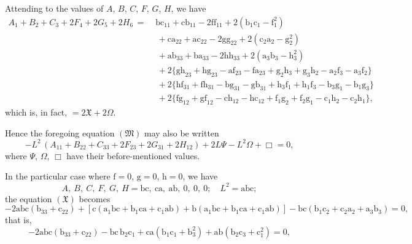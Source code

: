 \documentclass[11pt,a4paper]{article}
\begin{document}
Attending to the values of $A$, $B$, $C$, $F$, $G$, $H$, we have
\begin{align*}
A_{1} + B_{2} + C_{3} + 2F_{4} + 2G_{5} + 2H_{6}\,= \;& \text{bc}_{11} + \text{cb}_{11} - 2\text{ff}_{11} + 2(\text{b}_{1}\text{c}_{1} - \text{f}_{1}^{2})\\
                                                                                                                  &\,+ \text{ca}_{22} + \text{ac}_{22} - 2\text{gg}_{22} + 2(\text{c}_{2}\text{a}_{2} - \text{g}_{2}^{2})\\
                                                                                                                  &\,+ \text{ab}_{33} + \text{ba}_{33} - 2\text{hh}_{33} + 2(\text{a}_{3}\text{b}_{3} - \text{h}_{3}^{2})\\
                                                                                                                  &\,+ 2\{\text{gh}_{23} + \text{hg}_{23} - \text{af}_{23} - \text{fa}_{23} + \text{g}_{2}\text{h}_{3} + \text{g}_{3}\text{h}_{2} - \text{a}_{2}\text{f}_{3} - \text{a}_{3}\text{f}_{2}\}\\
                                                                                                                  &\,+ 2\{\text{hf}_{31} + \text{fh}_{31} - \text{bg}_{31} - \text{gb}_{31} + \text{h}_{3}\text{f}_{1} + \text{h}_{1}\text{f}_{3} - \text{b}_{3}\text{g}_{1} - \text{b}_{1}\text{g}_{3}\}\\
                                                                                                                  &\,+ 2\{\text{fg}_{12} + \text{gf}_{12} - \text{ch}_{12} - \text{hc}_{12} + \text{f}_{1}\text{g}_{2} + \text{f}_{2}\text{g}_{1} - \text{c}_{1}\text{h}_{2} - \text{c}_{2}\text{h}_{1}\},
\end{align*}
which is, in fact, $= 2\mathfrak{X} + 2\Omega$.

\medskip
Hence the foregoing equation $(\mathfrak{M})$ may also be written
\[
-L^{2}\,(A_{11} + B_{22} + C_{33} + 2F_{23} + 2G_{31} + 2H_{12}) + 2L\Psi - L^{2}\Omega + \Box = 0,
\]
where $\Psi$, $\Omega$, $\Box$ have their before-mentioned values.

\medskip
In the particular case where $\text{f} = 0$, $\text{g} = 0$, $\text{h} = 0$, we have
\[
A,\ B,\ C,\ F,\ G,\ H = \text{bc},\ \text{ca},\ \text{ab},\ 0,\ 0,\ 0;\quad L^{2} = \text{abc};
\]
the equation $(\mathfrak{X})$ becomes
\[
-2\text{abc}(\text{b}_{33} + \text{c}_{22}) + [\text{c}(\text{a}_{1}\text{bc} + \text{b}_{1}\text{ca} + \text{c}_{1}\text{ab}) + \text{b}(\text{a}_{1}\text{bc} + \text{b}_{1}\text{ca} + \text{c}_{1}\text{ab})] - \text{bc}(\text{b}_{1}\text{c}_{2} + \text{c}_{2}\text{a}_{2} + \text{a}_{3}\text{b}_{3}) = 0,
\]
that is,
\[
-2\text{abc}(\text{b}_{33} + \text{c}_{22}) - \text{bc}\,\text{b}_{2}\text{c}_{1} + \text{ca}(\text{b}_{1}\text{c}_{1} + \text{b}_{3}^{2}) + \text{ab}(\text{b}_{2}\text{c}_{3} + \text{c}_{1}^{2}) = 0,
\]
\clearpage
\end{document}
